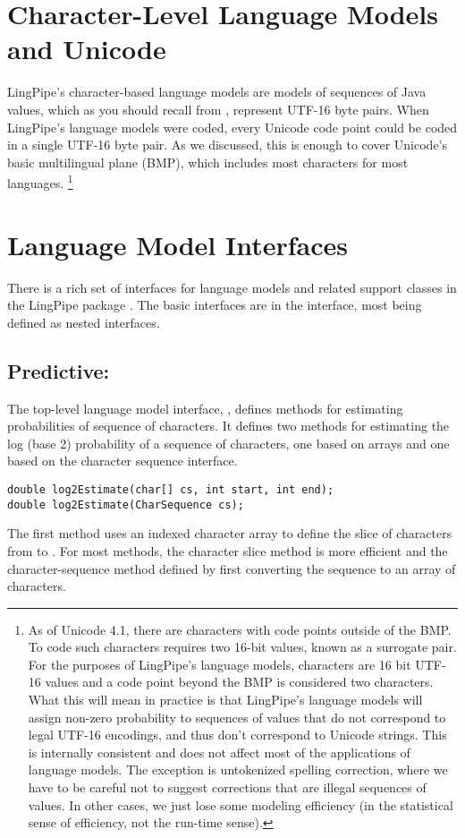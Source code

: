 \section{Character-Level Language Models and Unicode}

LingPipe's character-based language models are models of sequences of
Java  values, which as you should recall from
, represent UTF-16 byte pairs.  When LingPipe's
language models were coded, every Unicode code point could be coded in
a single UTF-16 byte pair.  As we discussed, this is enough to cover
Unicode's basic multilingual plane (BMP), which includes most
characters for most languages.%
%
\footnote{As of Unicode 4.1, there are characters with code points
  outside of the BMP.  To code such characters requires two 16-bit
   values, known as a surrogate pair.  For the purposes of
  LingPipe's language models, characters are 16 bit UTF-16 values and
  a code point beyond the BMP is considered two characters.  What this
  will mean in practice is that LingPipe's language models will assign
  non-zero probability to sequences of  values that do not
  correspond to legal UTF-16 encodings, and thus don't correspond to
  Unicode strings.  This is internally consistent and does not affect
  most of the applications of language models.  The exception is
  untokenized spelling correction, where we have to be careful not to
  suggest corrections that are illegal sequences of 
  values.  In other cases, we just lose some modeling efficiency (in
  the statistical sense of efficiency, not the run-time sense).}




\section{Language Model Interfaces}\label{section:char-lm-interfaces}

There is a rich set of interfaces for language models and related
support classes in the LingPipe package .  The
basic interfaces are in the  interface, most
being defined as nested interfaces.

\subsection{Predictive: }

The top-level language model interface, , defines
methods for estimating probabilities of sequence of characters.  It
defines two methods for estimating the log (base 2) probability of a
sequence of characters, one based on arrays and one based on the
character sequence interface.
%
\begin{verbatim}
double log2Estimate(char[] cs, int start, int end);
double log2Estimate(CharSequence cs);
\end{verbatim}
%
The first method uses an indexed character array to define the slice
of characters from  to .  For most
methods, the character slice method is more efficient and the
character-sequence method defined by first converting the sequence to
an array of characters.

